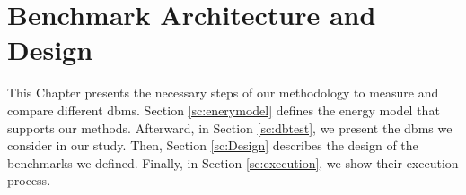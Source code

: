 \chapter{Benchmark Architecture and Design}
\label{cha:middle}



This Chapter presents the necessary steps of our methodology to measure and compare different \gls{dbms}. Section \ref{sc:enerymodel} defines the energy model that supports our methods. Afterward, in Section \ref{sc:dbtest}, we present the \gls{dbms} we consider in our study.  Then, Section \ref{sc:Design} describes the design of the benchmarks we defined. Finally, in Section \ref{sc:execution}, we show their execution process.







